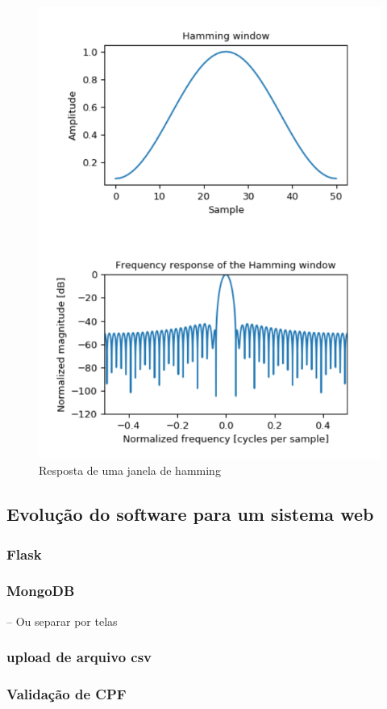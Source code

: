 \begin{figure}[h!]
	\begin{center}
		\includegraphics[width=1\linewidth]{images/janela_de_hamming.png}
		\caption{Resposta de uma janela de hamming}
		\label{fig:Janela_Hamming}
	\end{center}
\end{figure}

\subsection{Evolução do software para um sistema web}

\subsubsection{Flask}
\subsubsection{MongoDB}
-- Ou separar por telas
\subsubsection{upload de arquivo csv}
\subsubsection{Validação de CPF}
 